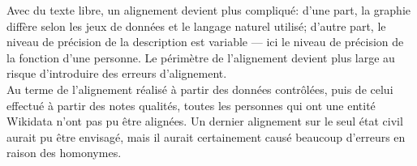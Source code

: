 \bigskip
\bigskip
Avec du texte libre, un alignement devient plus compliqué: d'une part, la graphie diffère selon les jeux de données et le langage naturel utilisé; d'autre part, le niveau de précision de la description est variable --- ici le niveau de précision de la fonction d'une personne. Le périmètre de l'alignement devient plus large au risque d'introduire des erreurs d'alignement. \\

Au terme de l'alignement réalisé à partir des données contrôlées, puis de celui effectué à partir des notes qualités, toutes les personnes qui ont une entité Wikidata n'ont pas pu être alignées. Un dernier alignement sur le seul état civil aurait pu être envisagé, mais il aurait certainement causé beaucoup d'erreurs en raison des homonymes.